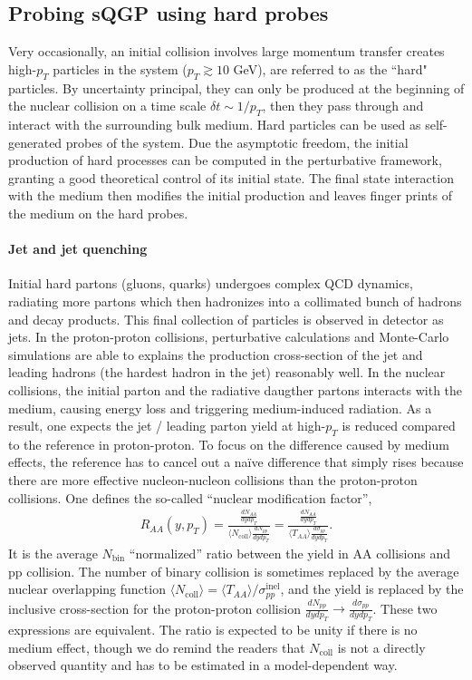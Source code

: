 \subsection{Probing sQGP using hard probes}
Very occasionally, an initial collision involves large momentum transfer creates high-$p_T$ particles in the system ($p_T\gtrsim 10$ GeV), are referred to as the ``hard" particles.
By uncertainty principal, they can only be produced at the beginning of the nuclear collision on a time scale $\delta t \sim 1/p_T$, then they pass through and interact with the surrounding bulk medium.
Hard particles can be used as self-generated probes of the system.
Due the asymptotic freedom, the initial production of hard processes can be computed in the perturbative framework, granting a good theoretical control of its initial state.
The final state interaction with the medium then modifies the initial production and leaves finger prints of the medium on the hard probes.

\paragraph{Jet and jet quenching}
Initial hard partons (gluons, quarks) undergoes complex QCD dynamics, radiating more partons which then hadronizes into a collimated bunch of hadrons and decay products.
This final collection of particles is observed in detector as jets.
In the proton-proton collisions, perturbative calculations and Monte-Carlo simulations are able to explains the production cross-section of the jet and leading hadrons (the hardest hadron in the jet) reasonably well.
In the nuclear collisions, the initial parton and the radiative daugther partons interacts with the medium, causing energy loss and triggering medium-induced radiation.
As a result, one expects the jet / leading parton yield at high-$p_T$ is reduced compared to the reference in proton-proton.
To focus on the difference caused by medium effects, the reference has to cancel out a na\"ive difference that simply rises because there are more effective nucleon-nucleon collisions than the proton-proton collisions.
One defines the so-called ``nuclear modification factor'',
\begin{eqnarray}
R_{AA}(y, p_T) = \frac{\frac{dN_{AA}}{dy dp_T}}{\langle N_{\textrm{coll}}\rangle \frac{dN_{pp}}{dy dp_T}} = \frac{\frac{dN_{AA}}{dy dp_T}}{\langle T_{AA} \rangle \frac{d\sigma_{pp}}{dy dp_T}}.
\end{eqnarray}
It is the average $N_{\textrm{bin}}$ ``normalized'' ratio between the yield in AA collisions and pp collision.
The number of binary collision is sometimes replaced by the average nuclear overlapping function $\langle N_{\textrm{coll}}\rangle = \langle T_{AA} \rangle /\sigma_{pp}^{\textrm{inel}}$, and the yield is replaced by the inclusive cross-section for the proton-proton collision $\frac{dN_{pp}}{dy dp_T}\rightarrow \frac{d\sigma_{pp}}{dy dp_T}$.
These two expressions are equivalent.
The ratio is expected to be unity if there is no medium effect, though we do remind the readers that $N_{\textrm{coll}}$ is not a directly observed quantity and has to be estimated in a model-dependent way.


